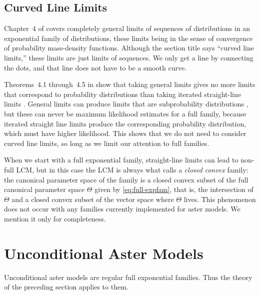 \subsection{Curved Line Limits}

Chapter~4 of \citet{geyer-thesis} covers completely general
limits of sequences of distributions in an exponential family of distributions,
these limits being in the sense of convergence of probability mass-density
functions.  Although the section title says ``curved line limits,'' these
limits are just limits of sequences.  We only get a line by connecting
the dots, and that line does not have to be a smooth curve.

Theorems~4.1 through~{4.5} in \citet{geyer-thesis} show that taking general
limits gives no more limits that correspond to probability distributions
than taking iterated straight-line limits \citep[Theorem~2.7]{geyer-thesis}.
General limits can produce
limits that are subprobability distributions
\citep[Examples~4.2 through~4.4]{geyer-thesis}, but these can never be
maximum likelihood estimates for a full family, because iterated straight
line limits produce the corresponding probability distribution, which must
have higher likelihood.
This shows that we do not need to consider curved line limits, so long
as we limit our attention to full families.

When we start with a full exponential family, straight-line limits can
lead to non-full LCM, but in this case the LCM is always what
\citet[Section~2.2]{geyer-thesis} calls a \emph{closed convex} family:
the canonical parameter space of the family is a closed convex subset of
the full canonical parameter space $\Theta$ given by \eqref{eq:full-expfam},
that is, the intersection of $\Theta$ and a closed convex subset of the
vector space where $\Theta$ lives.  This phenomenon does not occur with
any families currently implemented for aster models.  We mention it only
for completeness.

\section{Unconditional Aster Models}

Unconditional aster models are regular full exponential families.
Thus the theory of the preceding section applies to them.

